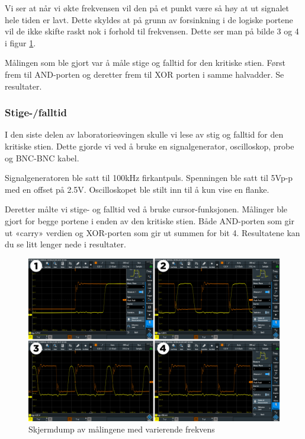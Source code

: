 \documentclass{article}
\begin{document}
Vi ser at når vi økte frekvensen vil den på et punkt være så høy at ut signalet hele tiden er lavt. Dette skyldes at på grunn av forsinkning i de logiske portene vil de ikke skifte raskt nok i forhold til frekvensen. Dette ser man på bilde 3 og 4 i figur \ref{fig:tegneserie1}.

Målingen som ble gjort var å måle stige og falltid for den kritiske stien. Først frem til AND-porten og deretter frem til XOR porten i samme halvadder. Se resultater.


\subsubsection{Stige-/falltid}
I den siste delen av laboratorieøvingen skulle vi lese av stig og falltid for den kritiske stien. Dette gjorde vi ved å bruke en signalgenerator, oscilloskop, probe og BNC-BNC kabel.

Signalgeneratoren ble satt til 100kHz firkantpuls. Spenningen ble satt til 5Vp-p med en offset på 2.5V.  Oscilloskopet ble stilt inn til å kun vise en flanke.

Deretter målte vi stige- og falltid ved å bruke cursor-funksjonen. Målinger ble gjort for begge portene i enden av den kritiske stien. Både AND-porten som gir ut «carry» verdien og XOR-porten som gir ut summen for bit 4. Resultatene kan du se litt lenger nede i resultater.

\begin{figure}[t]
	\centering
	\includegraphics[width=1\linewidth]{tegneserie1}
	\caption{Skjermdump av målingene med varierende frekvens}
	\label{fig:tegneserie1}
\end{figure}


\newpage
\newpage
\end{document}
